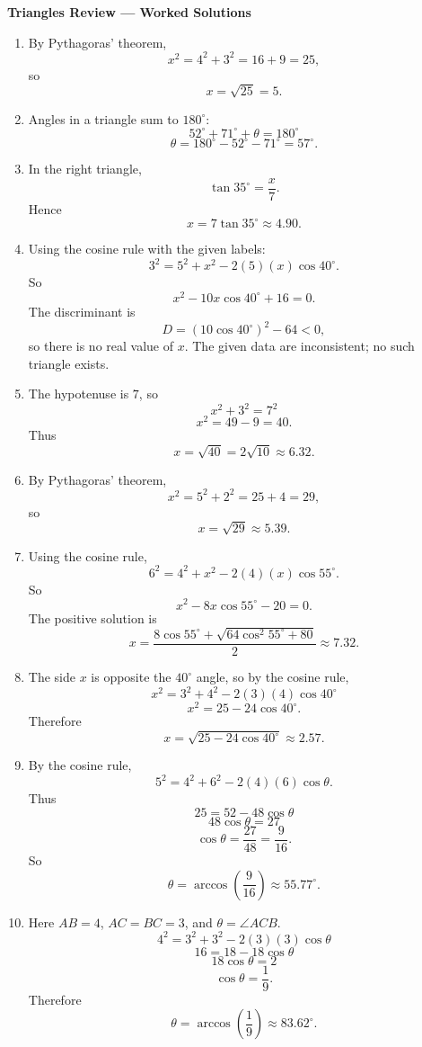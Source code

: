 \documentclass[11pt,a4paper]{article}
\begin{document}
\begin{center}
    {\LARGE \textbf{Triangles Review --- Worked Solutions}}\\[4pt]
\end{center}

\begin{enumerate}

\item %
By Pythagoras' theorem,
\[
x^2=4^2+3^2=16+9=25,
\]
so
\[
x=\sqrt{25}=5.
\]

\item %
Angles in a triangle sum to \(180^\circ\):
\[
52^\circ+71^\circ+\theta=180^\circ
\]
\[
\theta=180^\circ-52^\circ-71^\circ=57^\circ.
\]

\item %
In the right triangle,
\[
\tan 35^\circ=\frac{x}{7}.
\]
Hence
\[
x=7\tan 35^\circ\approx 4.90.
\]

\item %
Using the cosine rule with the given labels:
\[
3^2=5^2+x^2-2(5)(x)\cos 40^\circ.
\]
So
\[
x^2-10x\cos 40^\circ+16=0.
\]
The discriminant is
\[
D=(10\cos 40^\circ)^2-64<0,
\]
so there is no real value of \(x\). The given data are inconsistent; no such triangle exists.

\item %
The hypotenuse is \(7\), so
\[
x^2+3^2=7^2
\]
\[
x^2=49-9=40.
\]
Thus
\[
x=\sqrt{40}=2\sqrt{10}\approx 6.32.
\]

\item %
By Pythagoras' theorem,
\[
x^2=5^2+2^2=25+4=29,
\]
so
\[
x=\sqrt{29}\approx 5.39.
\]

\item %
Using the cosine rule,
\[
6^2=4^2+x^2-2(4)(x)\cos 55^\circ.
\]
So
\[
x^2-8x\cos 55^\circ-20=0.
\]
The positive solution is
\[
x=\frac{8\cos 55^\circ+\sqrt{64\cos^2 55^\circ+80}}{2}\approx 7.32.
\]

\item %
The side \(x\) is opposite the \(40^\circ\) angle, so by the cosine rule,
\[
x^2=3^2+4^2-2(3)(4)\cos 40^\circ
\]
\[
x^2=25-24\cos 40^\circ.
\]
Therefore
\[
x=\sqrt{25-24\cos 40^\circ}\approx 2.57.
\]

\item %
By the cosine rule,
\[
5^2=4^2+6^2-2(4)(6)\cos\theta.
\]
Thus
\[
25=52-48\cos\theta
\]
\[
48\cos\theta=27
\]
\[
\cos\theta=\frac{27}{48}=\frac{9}{16}.
\]
So
\[
\theta=\arccos\left(\frac{9}{16}\right)\approx 55.77^\circ.
\]

\item %
Here \(AB=4\), \(AC=BC=3\), and \(\theta=\angle ACB\).
\[
4^2=3^2+3^2-2(3)(3)\cos\theta
\]
\[
16=18-18\cos\theta
\]
\[
18\cos\theta=2
\]
\[
\cos\theta=\frac{1}{9}.
\]
Therefore
\[
\theta=\arccos\left(\frac{1}{9}\right)\approx 83.62^\circ.
\]


\end{enumerate}
\end{document}
